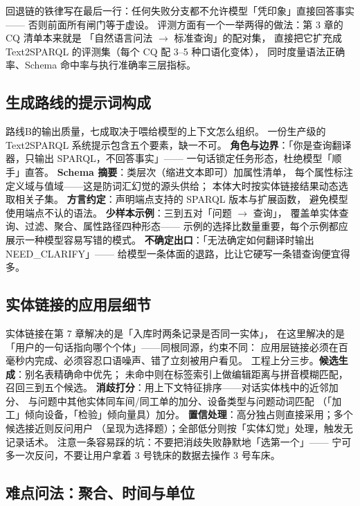 

回退链的铁律写在最后一行：任何失败分支都不允许模型「凭印象」直接回答事实——
否则前面所有闸门等于虚设。
评测方面有一个一举两得的做法：第 3 章的 CQ 清单本来就是
「自然语言问法 \(\rightarrow\) 标准查询」的配对集，
直接把它扩充成 Text2SPARQL 的评测集（每个 CQ 配 3--5 种口语化变体），
同时度量语法正确率、Schema 命中率与执行准确率三层指标。

\subsection{生成路线的提示词构成}

路线B的输出质量，七成取决于喂给模型的上下文怎么组织。
一份生产级的 Text2SPARQL 系统提示包含五个要素，缺一不可。
\textbf{角色与边界}：「你是查询翻译器，只输出 SPARQL，不回答事实」——
一句话锁定任务形态，杜绝模型「顺手」直答。
\textbf{Schema 摘要}：类层次（缩进文本即可）加属性清单，
每个属性标注定义域与值域——这是防词汇幻觉的源头供给；
本体大时按实体链接结果动态选取相关子集。
\textbf{方言约定}：声明端点支持的 SPARQL 版本与扩展函数，
避免模型使用端点不认的语法。
\textbf{少样本示例}：三到五对「问题 \(\rightarrow\) 查询」，
覆盖单实体查询、过滤、聚合、属性路径四种形态——
示例的选择比数量重要，每个示例都应展示一种模型容易写错的模式。
\textbf{不确定出口}：「无法确定如何翻译时输出 NEED\_CLARIFY」——
给模型一条体面的退路，比让它硬写一条错查询便宜得多。

\subsection{实体链接的应用层细节}

实体链接在第 7 章解决的是「入库时两条记录是否同一实体」，
在这里解决的是「用户的一句话指向哪个个体」——同根同源，约束不同：
应用层链接必须在百毫秒内完成、必须容忍口语噪声、错了立刻被用户看见。
工程上分三步。\textbf{候选生成}：别名表精确命中优先；
未命中则在标签索引上做编辑距离与拼音模糊匹配，召回三到五个候选。
\textbf{消歧打分}：用上下文特征排序——对话实体栈中的近邻加分、
与问题中其他实体同车间/同工单的加分、设备类型与问题动词匹配
（「加工」倾向设备，「检验」倾向量具）加分。
\textbf{置信处理}：高分独占则直接采用；多个候选接近则反问用户
（呈现为选择题）；全部低分则按「实体幻觉」处理，触发无记录话术。
注意一条容易踩的坑：不要把消歧失败静默地「选第一个」——
宁可多一次反问，不要让用户拿着 3 号铣床的数据去操作 3 号车床。

\subsection{难点问法：聚合、时间与单位}

